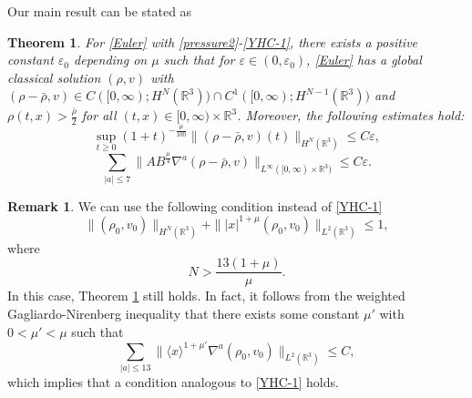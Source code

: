 \documentclass[11pt,twoside]{article}
\def\f{\frac}
\theoremstyle{plain}
\newtheorem{theorem}{Theorem}[section]
\theoremstyle{definition}
\theoremstyle{assumption}
\newtheorem{remark}{Remark}[section]
\numberwithin{equation}{section}
\begin{document}
Our main result can be stated as
\begin{theorem}\label{thm:main-global-1}
For \eqref{Euler} with \eqref{pressure2}-\eqref{YHC-1},
there exists a positive constant $\varepsilon_0$ depending on $\mu$ such that for
$\varepsilon\in(0,\varepsilon_0)$, \eqref{Euler} has a global classical
solution $(\rho, v)$ with $(\rho-\bar\rho, v)\in C([0,\infty);H^{N}(\mathbb R^3))\cap C^1([0,\infty);H^{N-1}(\mathbb R^3))$
and $\rho(t,x)>\f{\bar\rho}{2}$ for all $(t,x)\in [0,\infty)\times\mathbb R^3$.
Moreover, the following estimates hold:
\begin{equation}\label{YHCCC-01}
	\sup_{t\geq 0}
	(1+t)^{-\frac{\mu}{100}}
	\|(\rho-\bar\rho,v)(t)\|_{H^N(\mathbb{R}^3)}
	\leq C\varepsilon,
\end{equation}
\begin{equation}\label{YHCCC-03}
	\sum_{|a|\leq 7}
	\big\|
	A B^{\frac{\mu}{4}}
	\nabla^a(\rho-\bar\rho,v)
	\big\|_{L^\infty([0,\infty)\times\mathbb{R}^3)}
	\leq C\varepsilon.
\end{equation}
\end{theorem}



\begin{remark}\label{YHC-90}
	We can use the following condition instead of \eqref{YHC-1}
	\begin{equation}\label{YHC-91}
		\|(\rho_0,v_0)\|_{H^N(\mathbb R^3)}
		+\||x|^{1+\mu}(\rho_0,v_0)\|_{L^2(\mathbb R^3)}
		\leq 1,
	\end{equation}
	where
\begin{equation}\label{YHC-999}
N>\frac{13(1+\mu)}{\mu}.
\end{equation}
In this case, Theorem \ref{thm:main-global-1} still holds.
	In fact, it follows from the weighted Gagliardo-Nirenberg inequality that there exists some constant $\mu'$
with $0<\mu'<\mu$ such that
	\begin{equation}\label{WY-1}
		\sum_{|a|\leq 13}
		\big\|
		\langle x\rangle^{1+\mu'}
		\nabla^a(\rho_0,v_0)
		\big\|_{L^2(\mathbb R^3)}\leq C,
	\end{equation}
which implies that a condition analogous to \eqref{YHC-1} holds.
		\end{remark}
\end{document}
